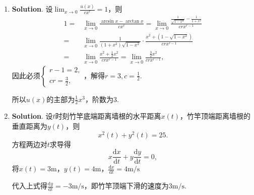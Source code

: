 \documentclass[../main.tex]{subfiles}
\begin{document}
\begin{enumerate}
          又
          \[
              \begin{aligned}
                  \lim_{x\to0}\frac{f(1+x)-3f(1-x)}{x^2}= {} & \lim_{x\to0}\frac{f'(1+x)+3f'(1-x)}{2x}                                     \\
                  = {}                                       & \lim_{x\to0}\frac{f'(1+x)-f'(1)}{2x}-3\lim_{x\to0}\frac{f'(1-x)-f'(1)}{-2x} \\
                  = {}                                       & -f''(1)=3,
              \end{aligned}
          \]
          所以$f''(1)=-3$.

    \item \textbf{Solution}. 设$\lim_{x\to0}\frac{u(x)}{cx^{r}}=1$，则
          \[
              \begin{aligned}
                  1= {} & \lim_{x\to0}\frac{\arcsin x-\arctan x}{cx^{r}}=\lim_{x\to0}\frac{\frac{1}{\sqrt{1-x^{2}}}-\frac{1}{1+x^{2}}}{crx^{r-1}} \\
                  = {}  & \lim_{x\to0}\frac{1}{(1+x^{2})\sqrt{1-x^2}}\cdot\frac{x^{2}+(1-\sqrt{1-x^2})}{crx^{r-1}}                                \\
                  = {}  & \lim_{x\to0}\frac{x^2+\frac{1}{2}x^2}{crx^{r-1}}=\lim_{x\to0}\frac{\frac{3}{2}x^2}{crx^{r-1}},
              \end{aligned}
          \]
          因此必须$\begin{cases}
                  r-1=2, \\
                  cr=\frac{3}{2},
              \end{cases}$，解得$r=3,c=\frac{1}{2}$.

          所以$u(x)$的主部为$\frac{1}{2}x^{3}$，阶数为3.

    \item \textbf{Solution}. 设$t$时刻竹竿底端距离墙根的水平距离$x(t)$，竹竿顶端距离墙根的垂直距离为$y
              (t)$，则
          \[
              x^{2}(t)+y^{2}(t)=25.
          \]
          方程两边对$t$求导得
          \[
              x\frac{\mathrm{d}x}{\mathrm{d}t}+y\frac{\mathrm{d}y}{\mathrm{d}t}=0,
          \]
          将$x(t)=3\mathrm{m}$，$y(t)=4\mathrm{m}$，$\frac{\mathrm{d}x}{\mathrm{d}t}=
              4\mathrm{m/s}$

          代入上式得$\frac{\mathrm{d}y}{\mathrm{d}t}=-3\mathrm{m/s}$，即竹竿顶端下滑的速度为$3
              \mathrm{m/s}$.
\end{enumerate}
\end{document}
